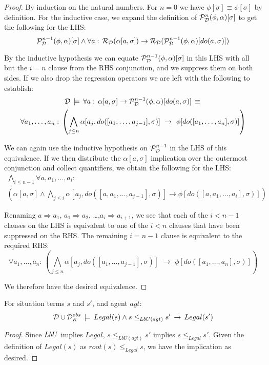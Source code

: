 \begin{proof}
By induction on the natural numbers. For $n=0$ we have $\phi[\sigma]\equiv\phi[\sigma]$
by definition. For the inductive case, we expand the definition of
$\mathcal{P}_{\mathcal{D}}^{n}(\phi,\alpha)[\sigma]$ to get the following for the
LHS:\[
\mathcal{P}_{\mathcal{D}}^{n-1}(\phi,\alpha)[\sigma]\wedge\forall a:\,\mathcal{R}_{\mathcal{D}}(\alpha[a,\sigma])\rightarrow\mathcal{R}_{\mathcal{D}}(\mathcal{P}_{\mathcal{D}}^{n-1}(\phi,\alpha)[do(a,\sigma)])\]


By the inductive hypothesis we can equate $\mathcal{P}_{\mathcal{D}}^{n-1}(\phi,\alpha)[\sigma]$
in this LHS with all but the $i=n$ clause from the RHS conjunction,
and we suppress them on both sides. If we also drop the regression
operators we are left with the following to establish:\begin{multline*}
\mathcal{D}\,\models\,\forall a:\,\alpha[a,\sigma]\rightarrow\mathcal{P}_{\mathcal{D}}^{n-1}(\phi,\alpha)[do(a,\sigma)]\,\equiv\,\\
\forall a_{1},\dots,a_{n}:\,\left(\bigwedge_{j\leq n}\alpha[a_{j},do([a_{1},\dots,a_{j-1}],\sigma)]\,\,\rightarrow\,\,\phi[do([a_{1},\dots,a_{n}],\sigma)]\right)\end{multline*}


We can again use the inductive hypothesis on $\mathcal{P}_{\mathcal{D}}^{n-1}$ in
the LHS of this equivalence. If we then distribute the $\alpha[a,\sigma]$
implication over the outermost conjunction and collect quantifiers,
we obtain the following for the LHS:\begin{multline*}
\bigwedge_{i\leq n-1}\forall a,a_{1},\dots,a_{i}:\\
\left(\alpha[a,\sigma]\wedge\bigwedge_{j\leq i}\alpha[a_{j},do([a,a_{1},\dots,a_{j-1}],\sigma)]\rightarrow\phi[do([a,a_{1},\dots,a_{i}],\sigma)]\right)\end{multline*}


Renaming $a\Rightarrow a_{1}$, $a_{1}\Rightarrow a_{2}$, \ldots{},$a_{i}\Rightarrow a_{i+1}$,
we see that each of the $i<n-1$ clauses on the LHS is equivalent
to one of the $i<n$ clauses that have been suppressed on the RHS.
The remaining $i=n-1$ clause is equivalent to the required RHS: \[
\forall a_{1},\dots,a_{n}:\,\left(\bigwedge_{j\leq n}\alpha[a_{j},do([a_{1},\dots,a_{j-1}],\sigma)]\,\,\rightarrow\,\,\phi[do([a_{1},\dots,a_{n}],\sigma)]\right)\]


We therefore have the desired equivalence. 
\end{proof}
\medskip{}


\begin{lemma}
\label{lem:pbu-implies-legal}For situation terms $s$ and $s'$,
and agent $agt$:\[
\mathcal{D}\cup\mathcal{D}_{K}^{obs}\,\models\, Legal(s)\wedge s\leq_{LbU(agt)}s'\,\rightarrow\, Legal(s')\]

\end{lemma}
\begin{proof}
Since $LbU$ implies $Legal$, $s\leq_{LbU(agt)}s'$ implies $s\leq_{Legal}s'$.
Given the definition of $Legal(s)$ as $root(s)\leq_{Legal}s$, we
have the implication as desired. 
\end{proof}
\medskip{}


